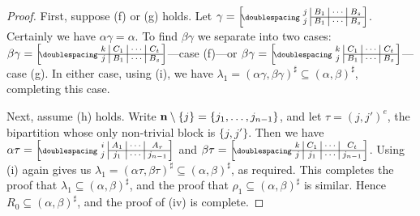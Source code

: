 \begin{lemma}
\begin{proof}
    First, suppose (f) or (g) holds.  Let
    $\gamma = \bipart{c|c|c|c}{2-4}
    {j & B_1 & \cdots & B_s}{j & B_1 & \cdots & B_s}$.  Certainly we have
    $\alpha\gamma = \alpha$.  To find $\beta\gamma$ we separate into two cases:
    $\beta\gamma = \bipart{c|c|c|c}{1-4}
    {k & C_1 & \cdots & C_t}{j & B_1 & \cdots & B_s}$---case (f)---or
    $\beta\gamma = \bipart{c|c|c|c}{2-4}
    {k & C_1 & \cdots & C_t}{j & B_1 & \cdots & B_s}$---case (g).
    In either case, using (i), we have
    $\lambda_1 = (\alpha\gamma, \beta\gamma)^\sharp
    \subseteq (\alpha,\beta)^\sharp$, completing this case.

    Next, assume (h) holds.
    Write $\mathbf{n} \setminus \{j\} = \{j_1, \ldots, j_{n-1}\}$, and let
    $\tau = (j,j')^e$, the bipartition whose only non-trivial block is
    $\{j, j'\}$.  Then we have
    $\alpha\tau = \bipart{c|c|c|c}{2-4}
    {i & A_1 & \cdots & A_r}{j & j_1 & \cdots & j_{n-1}}$ and
    $\beta\tau = \bipart{c|c|c|c}{1-4}
    {k & C_1 & \cdots & C_t}{j & j_1 & \cdots & j_{n-1}}$.
    Using (i) again gives us
    $\lambda_1 = (\alpha\tau, \beta\tau)^\sharp
    \subseteq (\alpha,\beta)^\sharp$,
    as required.  This completes the proof that
    $\lambda_1 \subseteq (\alpha,\beta)^\sharp$, and the proof that
    $\rho_1 \subseteq (\alpha,\beta)^\sharp$ is similar.  Hence $R_0 \subseteq
    (\alpha,\beta)^\sharp$, and the proof of (iv) is complete.
  \end{proof}
\end{lemma}


